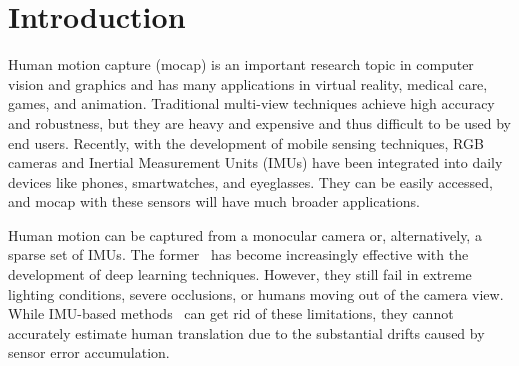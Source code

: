 \section{Introduction}
%
Human motion capture (mocap) is an important research topic in computer vision and graphics and has many applications in virtual reality, medical care, games, and animation.
%
Traditional multi-view techniques achieve high accuracy and robustness, but they are heavy and expensive and thus difficult to be used by end users.
%
Recently, with the development of mobile sensing techniques, RGB cameras and Inertial Measurement Units (IMUs) have been integrated into daily devices like phones, smartwatches, and eyeglasses. 
%
They can be easily accessed, and mocap with these sensors will have much broader applications.
%
%
%
%
%
\par
Human motion can be captured from a monocular camera or, alternatively, a sparse set of IMUs.
%
%
The former~\cite{ROMP,spin,PARE,VIBE} has become increasingly effective with the development of deep learning techniques.
%
However, they still fail in extreme lighting conditions, severe occlusions, or humans moving out of the camera view.
%
%
%
While IMU-based methods~\cite{DIP,TransPose,PIP,TIP} can get rid of these limitations, they cannot accurately estimate human translation due to the substantial drifts caused by sensor error accumulation.
%
